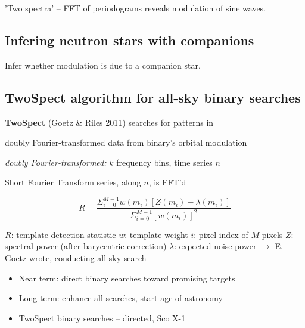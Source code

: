                 'Two spectra' -- FFT of periodograms reveals modulation of sine waves.

            \subsection{Infering neutron stars with companions}
            \label{inference}
 
                Infer whether modulation is due to a companion star.



\subsection{TwoSpect algorithm for all-sky binary searches}


\textbf{TwoSpect} (Goetz \& Riles 2011) searches for patterns in


doubly Fourier-transformed data from binary's orbital modulation


\emph{doubly Fourier-transformed:} $k$ frequency bins, time series
$n$


Short Fourier Transform series, along $n$, is FFT'd 


\begin{equation}
R=\frac{\Sigma_{i=0}^{M-1}w(m_{i})[Z(m_{i})-\lambda(m_{i})]}{\Sigma_{i=0}^{M-1}[w(m_{i})]^{2}}
\label{TwoSpect_R_statistic}
\end{equation}



$R$: template detection statistic
$w$: template weight
$i$: pixel index of $M$ pixels
$Z$: spectral power (after barycentric correction)
$\lambda$: expected noise power
$\rightarrow$ E. Goetz wrote, conducting all-sky search




\begin{itemize}
\item Near term: direct binary searches toward promising targets
\item Long term: enhance all searches, start age of astronomy
\item TwoSpect binary searches -- directed, Sco X-1
\end{itemize}


